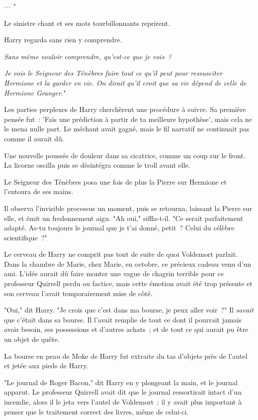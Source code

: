 --- "

Le sinistre chant et ses mots tourbillonnants reprirent.

Harry regarda sans rien y comprendre.

\emph{Sans même vouloir comprendre, qu'est-ce que je vois~?}

\emph{Je vois le Seigneur des Ténèbres faire tout ce qu'il peut pour ressusciter Hermione et la garder en vie. On dirait qu'il croit que sa vie dépend de celle de Hermione Granger.}"

Les parties perplexes de Harry cherchèrent une procédure à suivre. Sa première pensée fut~: 'Fais une prédiction à partir de ta meilleure hypothèse', mais cela ne le mena nulle part. Le méchant avait gagné, mais le fil narratif ne continuait pas comme il aurait dû.

Une nouvelle poussée de douleur dans sa cicatrice, comme un coup sur le front. La licorne oscilla puis se désintégra comme le troll avant elle.

Le Seigneur des Ténèbres posa une fois de plus la Pierre sur Hermione et l'entoura de ses mains.

Il observa l'invisible processus un moment, puis se retourna, laissant la Pierre sur elle, et émit un fredonnement aigu. "Ah oui," siffla-t-il. "Ce serait parfaitement adapté. As-tu toujours le journal que je t'ai donné, petit~? Celui du célèbre scientifique~?"

Le cerveau de Harry ne comprit pas tout de suite de quoi Voldemort parlait. Dans la chambre de Marie, chez Marie, en octobre, ce précieux cadeau venu d'un ami. L'idée aurait dû faire monter une vague de chagrin terrible pour ce professeur Quirrell perdu ou factice, mais cette émotion avait été trop présente et son cerveau l'avait temporairement mise de côté.

"Oui," dit Harry. "Je crois que c'est dans ma bourse, je peux aller voir~?" Il \emph{savait} que c'était dans sa bourse. Il l'avait remplie de tout ce dont il pourrait jamais avoir besoin, ses possessions et d'autres achats~; et de tout ce qui aurait pu être un objet de quête.

La bourse en peau de Moke de Harry fut extraite du tas d'objets près de l'autel et jetée aux pieds de Harry.

"Le journal de Roger Bacon," dit Harry en y plongeant la main, et le journal apparut. Le professeur Quirrell avait dit que le journal ressortirait intact d'un incendie, alors il le jeta vers l'autel de Voldemort~; il y avait plus important à penser que le traitement correct des livres, même de celui-ci.

